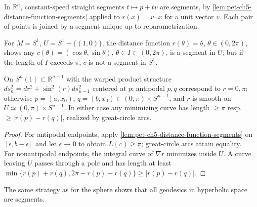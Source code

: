 \begin{example}
  \label{ex:pet-ch5-euclidean-segments}

  In $\mathbb R^n$, constant-speed straight segments $t\mapsto p+tv$ are segments, by
  \cref{lem:pet-ch5-distance-function-segments} applied to $r(x)=v\cdot x$ for a unit
  vector $v$. Each pair of points is joined by a segment unique up to
  reparametrization.
\end{example}

\begin{example}
  \label{ex:pet-ch5-circle-segment}

  For $M=S^1$, $U=S^1-\{(1,0)\}$, the distance function $r(\theta)=\theta$,
  $\theta\in(0,2\pi)$, shows any $c(\theta)=(\cos\theta,\sin\theta)$, $\theta\in
  I\subset(0,2\pi)$, is a segment in $U$; but if the length of $I$ exceeds $\pi$,
  $c$ is not a segment in $S^1$.
\end{example}

\begin{example}
  \label{ex:pet-ch5-sphere-segments}

  On $S^n(1)\subset\mathbb R^{n+1}$ with the warped product structure
  $ds_n^2=dr^2+\sin^2(r)ds_{n-1}^2$ centered at $p$: antipodal $p,q$ correspond to
  $r=0,\pi$; otherwise $p=(a,x_0)$, $q=(b,x_0)\in(0,\pi)\times S^{n-1}$, and $r$ is
  smooth on $U\simeq(0,\pi)\times S^{n-1}$. In either case any minimizing curve has
  length $\ge\pi$ resp.\ $\ge|r(p)-r(q)|$, realized by great-circle arcs.
\end{example}
\begin{proof}
  \sketch
  For antipodal endpoints, apply \cref{lem:pet-ch5-distance-function-segments} on
  $[\epsilon,b-\epsilon]$ and let $\epsilon\to0$ to obtain $L(c)\ge\pi$;
  great-circle arcs attain equality.  For nonantipodal endpoints, the integral
  curve of $\nabla r$ minimizes inside $U$.  A curve leaving $U$ passes through a
  pole and has length at least
  $\min\{r(p)+r(q),2\pi-r(p)-r(q)\}\ge|r(p)-r(q)|$.
\end{proof}

\begin{example}
  \label{ex:pet-ch5-hyperbolic-segments}

  The same strategy as for the sphere shows that all geodesics in hyperbolic space
  are segments.
\end{example}

